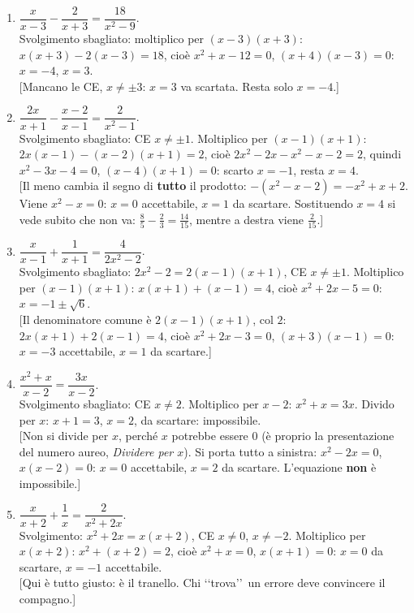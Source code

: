 \documentclass[11pt]{report}
\begin{document}
\begin{enumerate}
    \item $\dfrac{x}{x-3}-\dfrac{2}{x+3}=\dfrac{18}{x^2-9}$.\\
    Svolgimento sbagliato: moltiplico per $(x-3)(x+3)$: $x(x+3)-2(x-3)=18$, cioè $x^2+x-12=0$, $(x+4)(x-3)=0$: $x=-4$, $x=3$.\\
    {[}Mancano le CE, $x\neq\pm3$: $x=3$ va scartata. Resta solo $x=-4$.{]}

    \item $\dfrac{2x}{x+1}-\dfrac{x-2}{x-1}=\dfrac{2}{x^2-1}$.\\
    Svolgimento sbagliato: CE $x\neq\pm1$. Moltiplico per $(x-1)(x+1)$: $2x(x-1)-(x-2)(x+1)=2$, cioè $2x^2-2x-x^2-x-2=2$, quindi $x^2-3x-4=0$, $(x-4)(x+1)=0$: scarto $x=-1$, resta $x=4$.\\
    {[}Il meno cambia il segno di \textbf{tutto} il prodotto: $-(x^2-x-2)=-x^2+x+2$. Viene $x^2-x=0$: $x=0$ accettabile, $x=1$ da scartare. Sostituendo $x=4$ si vede subito che non va: $\frac85-\frac23=\frac{14}{15}$, mentre a destra viene $\frac{2}{15}$.{]}

    \item $\dfrac{x}{x-1}+\dfrac{1}{x+1}=\dfrac{4}{2x^2-2}$.\\
    Svolgimento sbagliato: $2x^2-2=2(x-1)(x+1)$, CE $x\neq\pm1$. Moltiplico per $(x-1)(x+1)$: $x(x+1)+(x-1)=4$, cioè $x^2+2x-5=0$: $x=-1\pm\sqrt6$.\\
    {[}Il denominatore comune è $2(x-1)(x+1)$, col $2$: $2x(x+1)+2(x-1)=4$, cioè $x^2+2x-3=0$, $(x+3)(x-1)=0$: $x=-3$ accettabile, $x=1$ da scartare.{]}

    \item $\dfrac{x^2+x}{x-2}=\dfrac{3x}{x-2}$.\\
    Svolgimento sbagliato: CE $x\neq2$. Moltiplico per $x-2$: $x^2+x=3x$. Divido per $x$: $x+1=3$, $x=2$, da scartare: impossibile.\\
    {[}Non si divide per $x$, perché $x$ potrebbe essere $0$ (è proprio la presentazione del numero aureo, \textit{Dividere per $x$}). Si porta tutto a sinistra: $x^2-2x=0$, $x(x-2)=0$: $x=0$ accettabile, $x=2$ da scartare. L'equazione \textbf{non} è impossibile.{]}

    \item $\dfrac{x}{x+2}+\dfrac{1}{x}=\dfrac{2}{x^2+2x}$.\\
    Svolgimento: $x^2+2x=x(x+2)$, CE $x\neq0$, $x\neq-2$. Moltiplico per $x(x+2)$: $x^2+(x+2)=2$, cioè $x^2+x=0$, $x(x+1)=0$: $x=0$ da scartare, $x=-1$ accettabile.\\
    {[}Qui è tutto giusto: è il tranello. Chi \lq\lq trova\rq\rq\ un errore deve convincere il compagno.{]}
\end{enumerate}
\end{document}
